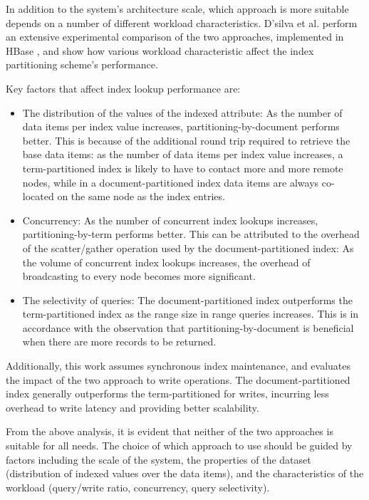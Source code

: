 In addition to the system's architecture scale,
which approach is more suitable depends on a number of different workload characteristics.
D'silva et al. \cite{dsilva:tworings} perform an extensive experimental comparison of the two approaches,
implemented in HBase \cite{hbase:doc}, and show how various workload characteristic affect the index partitioning scheme's performance.

Key factors that affect index lookup performance are:
\begin{itemize}

  \item The distribution of the values of the indexed attribute:
  As the number of data items per index value increases, partitioning-by-document performs better.
  This is because of the additional round trip required to retrieve the base data items:
  as the number of data items per index value increases, a term-partitioned index is likely to have to contact
  more and more remote nodes, while in a document-partitioned index data items are always co-located on the same node as
  the index entries.

  \item Concurrency:
  As the number of concurrent index lookups increases, partitioning-by-term performs better.
  This can be attributed to the overhead of the scatter/gather operation used by the document-partitioned index:
  As the volume of concurrent index lookups increases,
  the overhead of broadcasting to every node becomes more significant.

  \item The selectivity of queries:
  The document-partitioned index outperforms the term-partitioned index as the range size in range queries increases.
  This is in accordance with the observation that partitioning-by-document is beneficial when there are
  more records to be returned.

\end{itemize}

Additionally, this work assumes synchronous index maintenance, and evaluates the impact of the two approach to write
operations.
The document-partitioned index generally outperforms the term-partitioned for writes,
incurring less overhead to write latency and providing better scalability.

From the above analysis, it is evident that neither of the two approaches is suitable for all needs.
The choice of which approach to use should be guided by factors including the scale of the system,
the properties of the dataset (distribution of indexed values over the data items),
and the characteristics of the workload (query/write ratio, concurrency, query selectivity).

